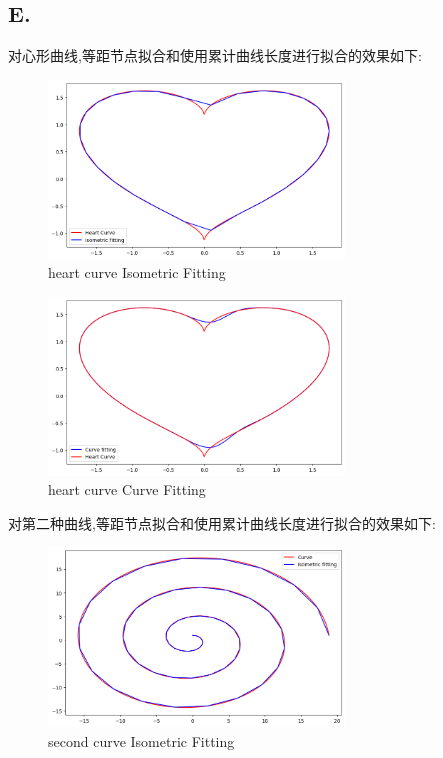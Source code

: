 \documentclass[a4paper]{article}
\begin{document}
\subsection*{E.}
对心形曲线,等距节点拟合和使用累计曲线长度进行拟合的效果如下:
\begin{figure}[H]
    \centering
    \includegraphics[width=0.7\textwidth]{E1_IsometricFitting.png}
    \caption{heart curve Isometric Fitting}
    \label{Fig}
\end{figure}
\begin{figure}[H]
    \centering
    \includegraphics[width=0.7\textwidth]{E1_CurveFitting.png}
    \caption{heart curve Curve Fitting}
    \label{Fig}
\end{figure}
对第二种曲线,等距节点拟合和使用累计曲线长度进行拟合的效果如下:
\begin{figure}[H]
    \centering
    \includegraphics[width=0.7\textwidth]{E2_IsometricFitting.png}
    \caption{second curve Isometric Fitting}
    \label{Fig}
\end{figure}
\end{document}
